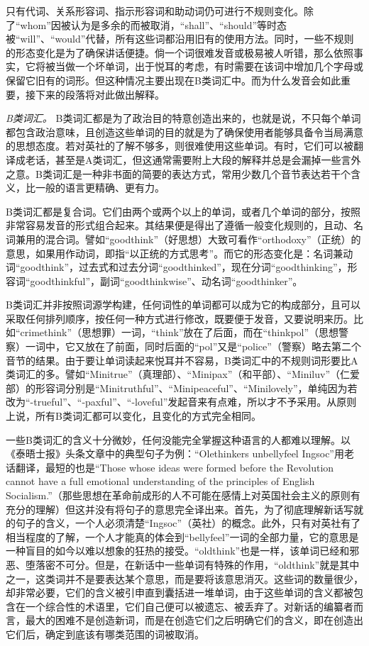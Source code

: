 只有代词、关系形容词、指示形容词和助动词仍可进行不规则变化。除了``whom''因被认为是多余的而被取消，``shall''、``should''等时态被``will''、``would''代替，所有这些词都沿用旧有的使用方法。同时，一些不规则的形态变化是为了确保讲话便捷。倘一个词很难发音或极易被人听错，那么依照事实，它将被当做一个坏单词，出于悦耳的考虑，有时需要在该词中增加几个字母或保留它旧有的词形。但这种情况主要出现在B类词汇中。而为什么发音会如此重要，接下来的段落将对此做出解释。

\sectionbreak

\emph{B类词汇。} B类词汇都是为了政治目的特意创造出来的，也就是说，不只每个单词都包含政治意味，且创造这些单词的目的就是为了确保使用者能够具备令当局满意的思想态度。若对英社的了解不够多，则很难使用这些单词。有时，它们可以被翻译成老话，甚至是A类词汇，但这通常需要附上大段的解释并总是会漏掉一些言外之意。B类词汇是一种非书面的简要的表达方式，常用少数几个音节表达若干个含义，比一般的语言更精确、更有力。

B类词汇都是复合词。它们由两个或两个以上的单词，或者几个单词的部分，按照非常容易发音的形式组合起来。其结果便是得出了遵循一般变化规则的，且动、名词兼用的混合词。譬如``goodthink''（好思想）大致可看作``orthodoxy''（正统）的意思，如果用作动词，即指``以正统的方式思考''。而它的形态变化是：名词兼动词``goodthink''，过去式和过去分词``goodthinked''，现在分词``goodthinking''，形容词``goodthinkful''，副词``goodthinkwise''、动名词``goodthinker''。

B类词汇并非按照词源学构建，任何词性的单词都可以成为它的构成部分，且可以采取任何排列顺序，按任何一种方式进行修改，既要便于发音，又要说明来历。比如``crimethink''（思想罪）一词，``think''放在了后面，而在``thinkpol''（思想警察）一词中，它又放在了前面，同时后面的``pol''又是``police''（警察）略去第二个音节的结果。由于要让单词读起来悦耳并不容易，B类词汇中的不规则词形要比A类词汇的多。譬如``Minitrue''（真理部）、``Minipax''（和平部）、``Miniluv''（仁爱部）的形容词分别是``Minitruthful''、``Minipeaceful''、``Minilovely''，单纯因为若改为``-trueful''、``-paxful''、``-loveful''发起音来有点难，所以才不予采用。从原则上说，所有B类词汇都可以变化，且变化的方式完全相同。

一些B类词汇的含义十分微妙，任何没能完全掌握这种语言的人都难以理解。以《泰晤士报》头条文章中的典型句子为例：``Olethinkers
unbellyfeel Ingsoc''用老话翻译，最短的也是``Those whose ideas were
formed before the Revolution cannot have a full emotional understanding
of the principles of English
Socialism.''（那些思想在革命前成形的人不可能在感情上对英国社会主义的原则有充分的理解）但这并没有将句子的意思完全译出来。首先，为了彻底理解新话写就的句子的含义，一个人必须清楚``Ingsoc''（英社）的概念。此外，只有对英社有了相当程度的了解，一个人才能真的体会到``bellyfeel''一词的全部力量，它的意思是一种盲目的如今以难以想象的狂热的接受。``oldthink''也是一样，该单词已经和邪恶、堕落密不可分。但是，在新话中一些单词有特殊的作用，``oldthink''就是其中之一，这类词并不是要表达某个意思，而是要将该意思消灭。这些词的数量很少，却非常必要，它们的含义被引申直到囊括进一堆单词，由于这些单词的含义都被包含在一个综合性的术语里，它们自己便可以被遗忘、被丢弃了。对新话的编纂者而言，最大的困难不是创造新词，而是在创造它们之后明确它们的含义，即在创造出它们后，确定到底该有哪类范围的词被取消。

